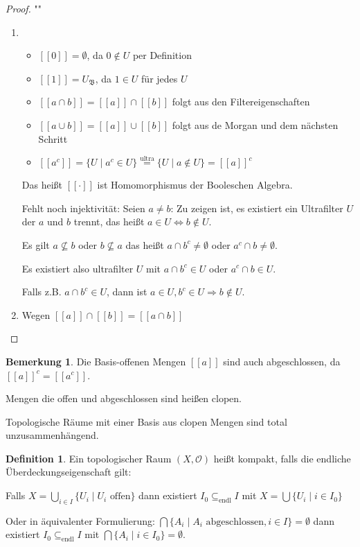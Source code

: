 \documentclass[12pt,parskip=full]{scrartcl}
\theoremstyle{definition}
\newtheorem{definition}[theorem]{Definition}
\newtheorem{remark}[theorem]{Bemerkung}
\begin{document}
	\begin{proof}""
		\begin{enumerate}
			\item
			\begin{itemize}
				\item $[[0]] = \emptyset$, da $0 \notin U$ per Definition
				\item $[[1]] = U_\mathfrak{B}$, da $1 \in U$ für jedes $U$
				\item $[[a \cap b]] = [[a]] \cap [[b]]$ folgt aus den Filtereigenschaften
				\item $[[a \cup b]] = [[a]] \cup [[b]]$ folgt aus de Morgan und dem nächsten Schritt
				\item $[[a^c]] = \{ U \mid a^c \in U \} \overset{\text{ultra}}{=} \{ U \mid a \notin U \} = [[a]]^c$
			\end{itemize}
			Das heißt $[[\cdot]]$ ist Homomorphismus der Booleschen Algebra.
		
			Fehlt noch injektivität: Seien $a \neq b$: Zu zeigen ist, es existiert ein Ultrafilter $U$ der $a$ und $b$ trennt, das heißt $a \in U \Leftrightarrow b \notin U$.
		
			Es gilt $a \nsubseteq b$ oder $b \nsubseteq a$ das heißt $a \cap b^c \neq \emptyset$ oder $a^c \cap b \neq \emptyset$.
		
			Es existiert also ultrafilter $U$ mit $a \cap b^c \in U$ oder $a^c \cap b \in U$.
			
			Falls z.B. $a \cap b^c \in U$, dann ist $a \in U, b^c \in U \Rightarrow b \notin U$.
			\item Wegen $[[a]] \cap [[b]] = [[a \cap b]]$
		\end{enumerate}
	\end{proof}

	\begin{remark}
		Die Basis-offenen Mengen $[[a]]$ sind auch abgeschlossen, da $[[a]]^c = [[a^c]]$.
		
		Mengen die offen und abgeschlossen sind heißen clopen.
		
		Topologische Räume mit einer Basis aus clopen Mengen sind total unzusammenhängend.
	\end{remark}

	\begin{definition}
		Ein topologischer Raum $(X, \mathcal{O})$ heißt kompakt, falls die endliche Überdeckungseigenschaft gilt:
		
		Falls $X = \bigcup_{i \in I} \{ U_i \mid U_i \text{ offen} \}$ dann existiert $I_0 \subseteq_\text{endl} I$ mit $X = \bigcup \{ U_i \mid i \in I_0 \}$
		
		Oder in äquivalenter Formulierung: $\bigcap \{ A_i \mid A_i \text{ abgeschlossen}, i \in I \} = \emptyset$ dann existiert $I_0 \subseteq_\text{endl} I$ mit $\bigcap \{ A_i \mid i \in I_0 \} = \emptyset$.
	\end{definition}
\end{document}
